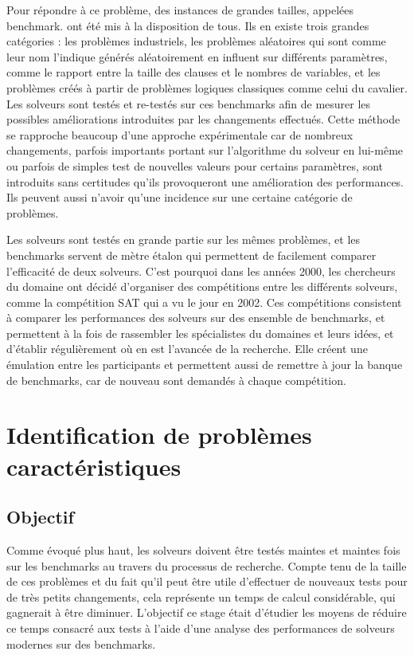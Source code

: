 \documentclass[a4paper,11pt]{article}
\begin{document}
Pour répondre à ce problème, des instances de grandes tailles, appelées benchmark. ont été mis à la disposition de tous. Ils en existe trois grandes catégories : les problèmes industriels, les problèmes aléatoires 
qui sont comme leur nom l'indique générés aléatoirement en influent sur différents paramètres, comme le rapport entre la taille des clauses et le nombres de variables, et les problèmes créés à partir de problèmes 
logiques classiques comme celui du cavalier. Les solveurs sont testés et re-testés sur ces benchmarks afin de mesurer les possibles améliorations introduites par les changements effectués. Cette méthode se rapproche 
beaucoup d'une approche expérimentale car de nombreux changements, parfois importants portant sur l'algorithme du solveur en lui-même ou parfois de simples test de nouvelles valeurs pour certains paramètres, sont 
introduits sans certitudes qu'ils provoqueront une amélioration des performances. Ils peuvent aussi n'avoir qu'une incidence sur une certaine catégorie de problèmes.

Les solveurs sont testés en grande partie sur les mêmes problèmes, et les benchmarks servent de mètre étalon qui permettent de facilement comparer l'efficacité de deux solveurs. C'est pourquoi dans les années 
2000, les chercheurs du domaine ont décidé d'organiser des compétitions entre les différents solveurs, comme la compétition SAT qui a vu le jour en 2002. Ces compétitions consistent à comparer les performances 
des solveurs sur des ensemble de benchmarks, et permettent à la fois de rassembler les spécialistes du domaines et leurs idées, et d'établir régulièrement où en est l'avancée de la recherche. Elle créent une 
émulation entre les participants et permettent aussi de remettre à jour la banque de benchmarks, car de nouveau sont demandés à chaque compétition.


\section{Identification de problèmes caractéristiques}
\label{sec:contribution}

\subsection{Objectif}

Comme évoqué plus haut, les solveurs doivent être testés maintes et maintes fois sur les benchmarks au travers du processus de recherche. Compte tenu de la taille de ces problèmes et du fait qu'il peut être utile 
d'effectuer de nouveaux tests pour de très petits changements, cela représente un temps de calcul considérable, qui gagnerait à être diminuer. L’objectif ce stage était d'étudier les moyens de réduire ce temps 
consacré aux tests à l'aide d'une analyse des performances de solveurs modernes sur des benchmarks.
\end{document}
